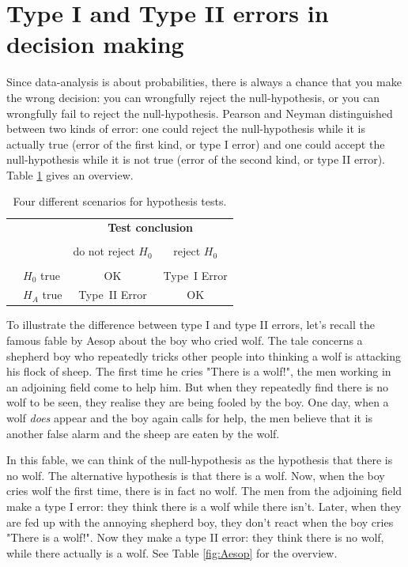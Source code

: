 \documentclass[]{book}\usepackage[]{graphicx}\usepackage[]{color}
\begin{document}
\section{Type I and Type II errors in decision making}


Since data-analysis is about probabilities, there is always a chance that you make the wrong decision: you can wrongfully reject the null-hypothesis, or you can wrongfully fail to reject the null-hypothesis. Pearson and Neyman distinguished between two kinds of error: one could reject the null-hypothesis while it is actually true (error of the first kind, or type I error) and one could accept the null-hypothesis while it is not true (error of the second kind, or type II error). Table \ref{tab:typeIandII} gives an overview.


\begin{table}[ht]
\caption{Four different scenarios for hypothesis tests.}
\centering
\begin{tabular}{l l c c}
& & \multicolumn{2}{c}{\textbf{Test conclusion}} \\
  \cline{3-4}
\vspace{-3.7mm} \\
& & do not reject $H_0$ &  reject $H_0$\\
  \cline{2-4}
\vspace{-3.7mm} \\
& $H_0$ true & OK &  Type~I Error \\
\raisebox{1.5ex}{\textbf{Truth}} & $H_A$ true & Type~II Error & OK \\
  \cline{2-4}
\end{tabular}
\label{tab:typeIandII}
\end{table}

To illustrate the difference between type I and type II errors, let's recall the famous fable by Aesop about the boy who cried wolf. The tale concerns a shepherd boy who repeatedly tricks other people into thinking a wolf is attacking his flock of sheep. The first time he cries "There is a wolf!", the men working in an adjoining field come to help him. But when they repeatedly find there is no wolf to be seen, they realise they are being fooled by the boy. One day, when a wolf \textit{does} appear and the boy again calls for help, the men believe that it is another false alarm and the sheep are eaten by the wolf.

In this fable, we can think of the null-hypothesis as the hypothesis that there is no wolf. The alternative hypothesis is that there is a wolf. Now, when the boy cries wolf the first time, there is in fact no wolf. The men from the adjoining field make a type I error: they think there is a wolf while there isn't. Later, when they are fed up with the annoying shepherd boy, they don't react when the boy cries "There is a wolf!". Now they make a type II error: they think there is no wolf, while there actually is a wolf. See Table \ref{fig:Aesop} for the overview.
\end{document}
